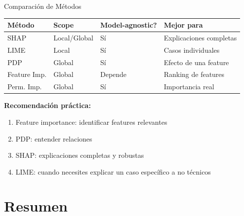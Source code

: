 \documentclass[aspectratio=169]{beamer}
\begin{document}
\begin{frame}{Comparación de Métodos}
\small
\begin{table}
\begin{tabular}{llll}
\toprule
\textbf{Método} & \textbf{Scope} & \textbf{Model-agnostic?} & \textbf{Mejor para} \\
\midrule
SHAP & Local/Global & Sí & Explicaciones completas \\
LIME & Local & Sí & Casos individuales \\
PDP & Global & Sí & Efecto de una feature \\
Feature Imp. & Global & Depende & Ranking de features \\
Perm. Imp. & Global & Sí & Importancia real \\
\bottomrule
\end{tabular}
\end{table}

\vspace{0.3cm}

\textbf{Recomendación práctica:}
\begin{enumerate}
\item Feature importance: identificar features relevantes
\item PDP: entender relaciones
\item SHAP: explicaciones completas y robustas
\item LIME: cuando necesites explicar un caso específico a no técnicos
\end{enumerate}
\end{frame}

\section{Resumen}
\end{document}
